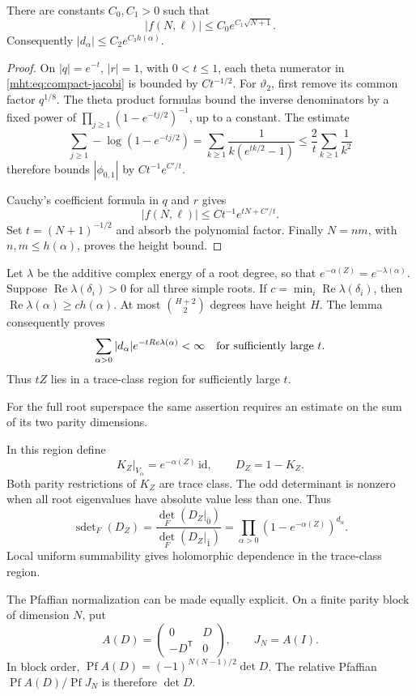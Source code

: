\begin{lemma}\label{mht:lem:compact-growth}
There are constants \(C_0,C_1>0\) such that
\[
 |f(N,\ell)|\leq C_0e^{C_1\sqrt{N+1}}.
\]
Consequently \(|d_\alpha|\leq C_2e^{C_3h(\alpha)}\).
\end{lemma}
\begin{proof}
On \(|q|=e^{-t}\), \(|r|=1\), with \(0<t\leq1\), each theta
numerator in \eqref{mht:eq:compact-jacobi} is bounded by
\(Ct^{-1/2}\). For \(\vartheta_2\), first remove its common
factor \(q^{1/8}\). The theta product formulas bound the inverse
denominators by a fixed power of
\(\prod_{j\geq1}(1-e^{-tj/2})^{-1}\), up to a constant.
The estimate
\[
 \sum_{j\geq1}-\log(1-e^{-tj/2})
   =\sum_{k\geq1}\frac1{k(e^{tk/2}-1)}
   \leq\frac2t\sum_{k\geq1}\frac1{k^2}
\]
therefore bounds \(|\phi_{0,1}|\) by \(Ct^{-1}e^{C'/t}\).

Cauchy's coefficient formula in \(q\) and \(r\) gives
\[
 |f(N,\ell)|\leq Ct^{-1}e^{tN+C'/t}.
\]
Set \(t=(N+1)^{-1/2}\) and absorb the polynomial factor.
Finally \(N=nm\), with \(n,m\leq h(\alpha)\), proves the
height bound.
\end{proof}

Let \(\lambda\) be the additive complex energy of a root degree,
so that \(e^{-\alpha(Z)}=e^{-\lambda(\alpha)}\).
Suppose \(\operatorname{Re}\lambda(\delta_i)>0\) for all three
simple roots. If
\(c=\min_i\operatorname{Re}\lambda(\delta_i)\), then
\(\operatorname{Re}\lambda(\alpha)\geq c h(\alpha)\).
At most \(\binom{H+2}{2}\) degrees have height \(H\).
The lemma consequently proves
\[
 \sum_{\alpha>0}|d_\alpha|
       e^{-t\operatorname{Re}\lambda(\alpha)}<\infty
 \quad\hbox{for sufficiently large }t.
\]
Thus \(tZ\) lies in a trace-class region for sufficiently large \(t\).

For the full root superspace the same assertion requires an
estimate on the sum of its two parity dimensions.

In this region define
\[
 K_Z|_{V_\alpha}=e^{-\alpha(Z)}\,\mathrm{id},\qquad D_Z=1-K_Z.
\]
Both parity restrictions of \(K_Z\) are trace class.
The odd determinant is nonzero when all root eigenvalues have
absolute value less than one. Thus
\[
 \operatorname{sdet}_F(D_Z)
    =\frac{\det_F(D_Z|_{\bar0})}{\det_F(D_Z|_{\bar1})}
    =\prod_{\alpha>0}(1-e^{-\alpha(Z)})^{d_\alpha}.
\]
Local uniform summability gives holomorphic dependence in the
trace-class region.

The Pfaffian normalization can be made equally explicit.
On a finite parity block of dimension \(N\), put
\[
 A(D)=\begin{pmatrix}0&D\\-D^{\mathsf T}&0\end{pmatrix},
 \qquad J_N=A(I).
\]
In block order,
\(\operatorname{Pf}A(D)=(-1)^{N(N-1)/2}\det D\).
The relative Pfaffian
\(\operatorname{Pf}A(D)/\operatorname{Pf}J_N\) is therefore
\(\det D\).

